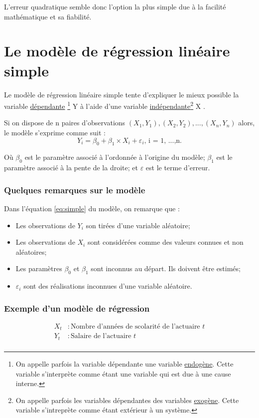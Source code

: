 \documentclass[11pt,french]{report}
\begin{document}
\bigskip
L'erreur quadratique semble donc l'option la plus simple due à la facilité mathématique et sa fiabilité.

\section{Le modèle de régression linéaire simple}
Le modèle de régression linéaire simple tente d'expliquer le mieux possible la variable \href{https://fr.wikipedia.org/wiki/Variable_dépendante}{dépendante} \footnote{On appelle parfois la variable dépendante une variable \href{https://fr.wikipedia.org/wiki/Endogène}{endogène}. Cette variable s'interprète comme étant une variable qui est due à une cause interne.}  Y à l'aide d'une variable \href{https://fr.wikipedia.org/wiki/Variable_indépendante}{indépendante}\footnote{On appelle parfois les variables dépendantes des variables \href{https://fr.wikipedia.org/wiki/Exogène}{exogène}. Cette variable s'intreprète comme étant extérieur à un système.} X . 

Si on dispose de n paires d'observations $(X_1, Y_1), (X_2, Y_2),...,(X_n, Y_n)$ alors, le modèle s'exprime  comme suit :
\begin{equation}
\label{eq:simple}
Y_i = \beta_0 + \beta_1\times X_i + \varepsilon_i \text{,  i = 1, ...,n.}
\end{equation}

Où $\beta_0$ est le paramètre associé à l'ordonnée à l'origine du modèle;
$\beta_1$ est le paramètre associé à la pente de la droite;
et $\varepsilon$ est le terme d'erreur.

\subsubsection*{Quelques remarques sur le modèle}
Dans l'équation \ref{eq:simple} du modèle, on remarque que :
\bigskip
\begin{itemize}
\item Les observations de $Y_i$ son tirées d'une variable aléatoire;
\item Les observations de $X_i$ sont considérées comme des valeurs connues et non aléatoires;
\item Les paramètres $\beta_0$ et $\beta_1$ sont inconnus au départ. Ils doivent être estimés;
\item $\varepsilon_i$ sont des réalisations inconnues d'une variable aléatoire.
\end{itemize}

\subsubsection*{Exemple d'un modèle de régression}
\begin{align*}
X_t &: \text{Nombre d'années de scolarité de l'actuaire } t \\
Y_t &: \text{Salaire de l'actuaire } t\\
\end{align*}
\end{document}
